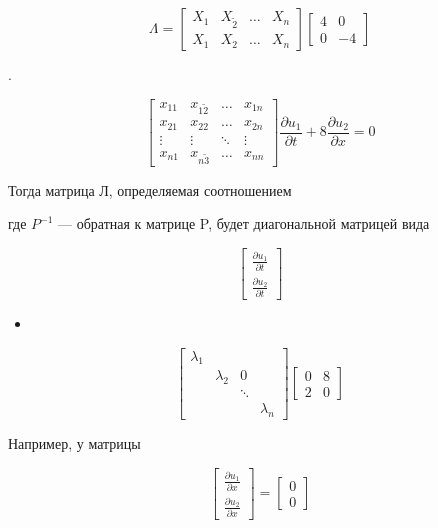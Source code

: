 \documentclass[
  ukrainian,
]{article}
\providecommand{\tightlist}{%
  \setlength{\itemsep}{0pt}\setlength{\parskip}{0pt}}
\begin{document}
\[
\Lambda =
\begin{bmatrix} X_1 & X_{\tilde{2}} & \dots & X_n \\ X_{1} & X_{2} & \dots & X_n \end{bmatrix}
\begin{bmatrix} 4 & 0 \\ 0 & -4 \end{bmatrix}
\]

.

\[
\begin{bmatrix} x_{11} & x_{1\tilde{2}} & \dots & x_{1n} \\ x_{21} & x_{22} & \dots & x_{2n} \\ \vdots & \vdots & \ddots & \vdots \\ x_{n1} & x_{n\tilde{3}} & \dots & x_{nn} \end{bmatrix}
\frac{\partial u_1}{\partial t} + 8 \frac{\partial u_2}{\partial x} = 0
\]

Тогда матрица Л, определяемая соотношением

где \(P^{-1}\) --- обратная к матрице P, будет диагональной матрицей
вида

\[
\begin{bmatrix} \frac{\partial u_1}{\partial t} \\ \frac{\partial u_2}{\partial t} \end{bmatrix}
\]

\begin{itemize}
\tightlist
\item
\end{itemize}

\[
\begin{bmatrix} \lambda_1 & & & \\ & \lambda_2 & 0 & \\ & & \ddots & \\ & & & \lambda_n \end{bmatrix}
\begin{bmatrix} 0 & 8 \\ 2 & 0 \end{bmatrix}
\]

Например, у матрицы

\[
\begin{bmatrix} \frac{\partial u_1}{\partial x} \\ \frac{\partial u_2}{\partial x} \end{bmatrix}
=
\begin{bmatrix} 0 \\ 0 \end{bmatrix}
\]
\end{document}
